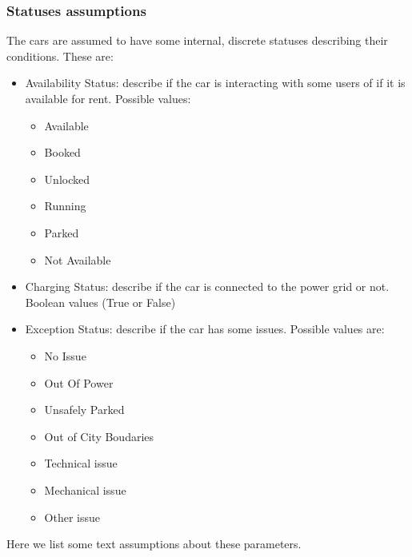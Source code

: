 \documentclass[11pt]{article} %
\begin{document}
\subsubsection{Statuses assumptions}
The cars are assumed to have some internal, discrete statuses describing their conditions. These are:
\begin{itemize}
	\item{Availability Status}: describe if the car is interacting with some users of if it is available for rent. Possible values:
		\begin{itemize}
		\item Available
		\item Booked
		\item Unlocked
		\item Running
		\item Parked
		\item Not Available
		\end{itemize}	
	\item{Charging Status}: describe if the car is connected to the power grid or not. Boolean values (True or False)
	\item{Exception Status}: describe if the car has some issues. Possible values are:
		\begin{itemize}
		\item No Issue
		\item Out Of Power
		\item Unsafely Parked
		\item Out of City Boudaries
		\item Technical issue
		\item Mechanical issue
		\item Other issue
		\end{itemize}
\end{itemize}
Here we list some text assumptions about these parameters.
\end{document}
